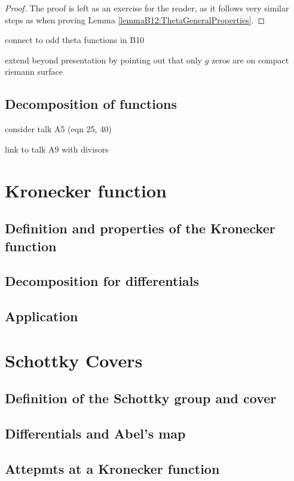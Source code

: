 \begin{proof}
    The proof is left as an exercise for the reader, as it follows very similar steps as when proving Lemma \ref{lemmaB12:ThetaGeneralProperties}.
\end{proof}

connect to odd theta functions in B10

extend beyond presentation by pointing out that only $g$ zeros are on compact riemann surface

\subsection{Decomposition of functions}
consider talk A5 (eqn 25, 40)

link to talk A9 with divisors

\section{Kronecker function}

\subsection{Definition and properties of the Kronecker function}

\subsection{Decomposition for differentials}

\subsection{Application}

\section{Schottky Covers}

\subsection{Definition of the Schottky group and cover}
\cite{Cha22}
\cite{ComputationalSchottky}

\subsection{Differentials and Abel's map}
\cite{Cha22}
\cite{ComputationalSchottky}

\subsection{Attepmts at a Kronecker function}
\cite{Cha22}


